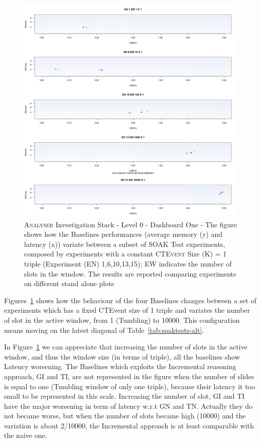 \begin{figure}[t!hb]
	\centering
	\includegraphics[width=\linewidth]{images/dashboard-1-split}	
	\caption[\textsc{Analyser} Investigation Stack - Level 0 - Dashboard One - Split Version]{\textsc{Analyser} Investigation Stack - Level 0 - Dashboard One - The figure shows how the Baselines performances (average memory (y) and latency (x))  variate between a subset of SOAK Test experiments, composed by experiments with a constant \textsc{CTEvent} Size (K) = 1 triple (Experiment (EN) 1,6,10,13,15); EW indicates the number of slots in the window. The results are reported comparing experiments on different stand alone plots} 
	\label{fig:result_dashboard_ka}
\end{figure}

Figures~\ref{fig:result_dashboard_ka} shows how the behaviour of the four Baselines changes between a set of experiments which has a fixed CTEvent size of 1 triple and variates the number of slot in the active window, from 1 (Tumbling) to 10000. This configuration means moving on the latest diagonal of Table~\ref{tab:soaktests-alt}.

In Figure~\ref{fig:result_dashboard_ka} we can appreciate that increasing the number of slots in the active window, and thus the window size (in terms of triple), all the baselines show Latency worsening. The Baselines which exploits the Incremental reasoning approach, GI and TI, are not represented in the figure when the number of slides is equal to one (Tumbling window of only one triple), because their latency it too small to be represented in this scale. Increasing the number of slot, GI and TI have the major worsening in term of latency w.r.t GN and TN. Actually they do not became worse, but when the number of slots became high (10000) and the variation is about 2/10000, the Incremental approach is at least comparable with the naive one.

